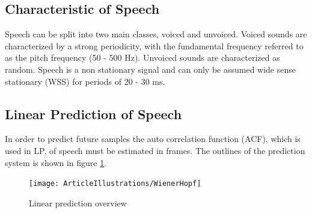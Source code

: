 \subsection{Characteristic of Speech}
Speech can be split into two main classes, voiced and unvoiced. Voiced sounds are characterized by a strong periodicity, with the fundamental frequency referred to as the pitch frequency (50 - 500 Hz). Unvoiced sounds are characterized as random. Speech is a non stationary signal and can only be assumed wide sense stationary (WSS) for periods of 20 - 30 ms\cite{Speech}. 

\subsection{Linear Prediction of Speech}
In order to predict future samples the auto correlation function (ACF), which is used in LP, of speech must be estimated in frames. The outlines of the prediction system is shown in figure \ref{fig:LinearPredictionOverview}.

\begin{figure}[H]
	\centering
	\texttt{[image: ArticleIllustrations/WienerHopf]}
	\caption{Linear prediction overview}
	\label{fig:LinearPredictionOverview}
\end{figure}



